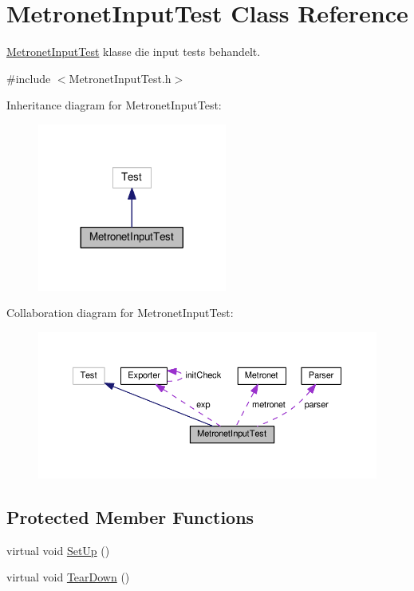 \hypertarget{class_metronet_input_test}{}\section{Metronet\+Input\+Test Class Reference}
\label{class_metronet_input_test}


\hyperlink{class_metronet_input_test}{Metronet\+Input\+Test} klasse die input tests behandelt.  




{\ttfamily \#include $<$Metronet\+Input\+Test.\+h$>$}



Inheritance diagram for Metronet\+Input\+Test\+:
\nopagebreak
\begin{figure}[H]
\begin{center}
\leavevmode
\includegraphics[width=176pt]{class_metronet_input_test__inherit__graph}
\end{center}
\end{figure}


Collaboration diagram for Metronet\+Input\+Test\+:
\nopagebreak
\begin{figure}[H]
\begin{center}
\leavevmode
\includegraphics[width=350pt]{class_metronet_input_test__coll__graph}
\end{center}
\end{figure}
\subsection*{Protected Member Functions}
\begin{DoxyCompactItemize}
\item 
virtual void \hyperlink{class_metronet_input_test_a863299908a545656568a7d534387e05d}{Set\+Up} ()
\item 
virtual void \hyperlink{class_metronet_input_test_a20f35cb70be79eee36b1dab816cf6806}{Tear\+Down} ()
\end{DoxyCompactItemize}
